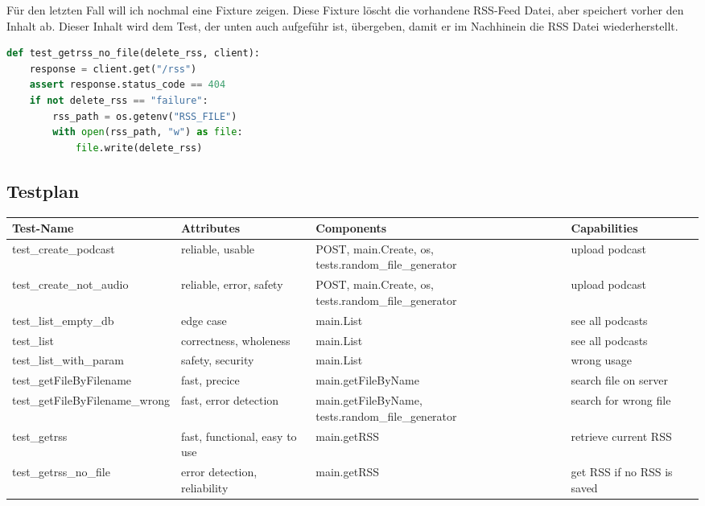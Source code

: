\documentclass{article}
\begin{document}
Für den letzten Fall will ich nochmal eine Fixture zeigen. Diese Fixture löscht die vorhandene RSS-Feed Datei, aber speichert vorher den Inhalt ab. Dieser Inhalt wird dem Test, der unten auch aufgeführ ist, übergeben, damit er im Nachhinein die RSS Datei wiederherstellt.  

\begin{lstlisting}[language=Python, caption=Test-Implementation von \texttt{/rss} bei nicht vorhandenem Feed]
def test_getrss_no_file(delete_rss, client): 
    response = client.get("/rss") 
    assert response.status_code == 404 
    if not delete_rss == "failure": 
        rss_path = os.getenv("RSS_FILE") 
        with open(rss_path, "w") as file: 
            file.write(delete_rss) 
\end{lstlisting}

\subsection{Testplan}
\begin{center}
  \begin{tabularx}{\textwidth}{|X|l|X|l|}
    \hline
    \textbf{Test-Name} & \textbf{Attributes} & \textbf{Components} & \textbf{Capabilities} \\
    \hline
    test\_create\_podcast & reliable, usable & POST, main.Create, os, tests.random\_file\_generator & upload podcast \\
    \hline
    test\_create\_not\_audio & reliable, error, safety & POST, main.Create, os, tests.random\_file\_generator & upload podcast \\
    \hline
    test\_list\_empty\_db & edge case & main.List & see all podcasts \\
    \hline
    test\_list & correctness, wholeness & main.List & see all podcasts \\
    \hline
    test\_list\_with\_param & safety, security & main.List & wrong usage \\
    \hline
    test\_getFileByFilename & fast, precice & main.getFileByName & search file on server \\
    \hline
    test\_getFileByFilename\_wrong & fast, error detection & main.getFileByName, tests.random\_file\_generator & search for wrong file \\
    \hline
    test\_getrss & fast, functional, easy to use & main.getRSS & retrieve current RSS \\
    \hline
    test\_getrss\_no\_file & error detection, reliability & main.getRSS & get RSS if no RSS is saved \\
    \hline
  \end{tabularx}
\end{center}
\end{document}
